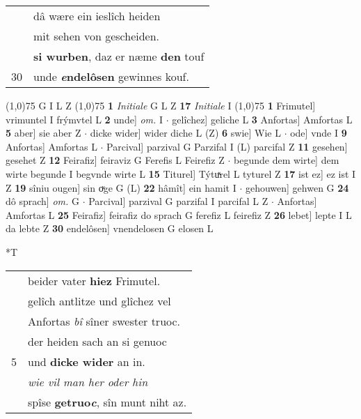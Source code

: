 \documentclass[8pt,a4paper,notitlepage]{article}
\begin{document}
\begin{table}[ht]
\begin{minipage}[t]{0.5\linewidth}
\begin{tabular}{rl}
 & dâ wære ein ieslîch heiden\\ 
 & mit sehen von gescheiden.\\ 
 & \textbf{si wurben}, daz er næme \textbf{den} touf\\ 
30 & unde \textbf{\textit{e}ndelôsen} gewinnes kouf.\\ 
\end{tabular}
\scriptsize
\line(1,0){75} \newline
G I L Z \newline
\line(1,0){75} \newline
\textbf{1} \textit{Initiale} G L Z  \textbf{17} \textit{Initiale} I  \newline
\line(1,0){75} \newline
\textbf{1} Frimutel] vrimuntel I frýmvtel L \textbf{2} unde] \textit{om.} I  $\cdot$ gelîchez] geliche L \textbf{3} Anfortas] Amfortas L \textbf{5} aber] sie aber Z  $\cdot$ dicke wider] wider diche L (Z) \textbf{6} swie] Wie L  $\cdot$ ode] vnde I \textbf{9} Anfortas] Amfortas L  $\cdot$ Parcival] parzival G Parzifal I (L) parcifal Z \textbf{11} gesehen] gesehet Z \textbf{12} Feirafiz] feiraviz G Ferefis L Feirefiz Z  $\cdot$ begunde dem wirte] dem wirte begunde I begvnde wirte L \textbf{15} Titurel] Týtuͯrel L tyturel Z \textbf{17} ist ez] ez ist I Z \textbf{19} sîniu ougen] sin oͮge G (L) \textbf{22} hâmît] ein hamit I  $\cdot$ gehouwen] gehwen G \textbf{24} dô sprach] \textit{om.} G  $\cdot$ Parcival] parzival G parzifal I parcifal L Z  $\cdot$ Anfortas] Amfortas L \textbf{25} Feirafiz] feirafiz do sprach G ferefiz L feirefiz Z \textbf{26} lebet] lepte I L da lebte Z \textbf{30} endelôsen] vnendelosen G elosen L \newline
\end{minipage}
\hspace{0.5cm}
\begin{minipage}[t]{0.5\linewidth}
\small
\begin{center}*T
\end{center}
\begin{tabular}{rl}
 & beider vater \textbf{hiez} Frimutel.\\ 
 & gelîch antlitze und glîchez vel\\ 
 & Anfortas \textit{bî} sîner swester truoc.\\ 
 & der heiden sach an si genuoc\\ 
5 & und \textbf{dicke wider} an in.\\ 
 & \textit{wie vil man her oder hin}\\ 
 & spîse \textbf{getruo\textit{c}}, sîn munt niht az.\\ 

\end{tabular}
\end{minipage}
\end{table}
\end{document}
